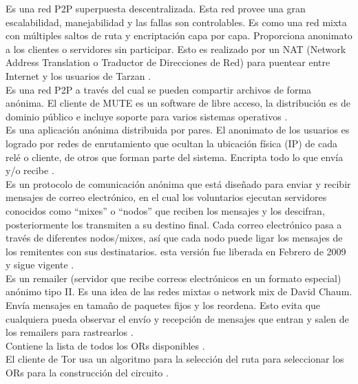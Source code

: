 \documentclass[10pt,letterpaper]{article}
\begin{document}
Es una red P2P superpuesta descentralizada. Esta red provee una gran escalabilidad, manejabilidad y las fallas son controlables. Es como una red mixta con múltiples saltos de ruta y encriptación capa por capa. Proporciona anonimato a los clientes o servidores sin participar. Esto es realizado por un NAT (Network Address Translation o Traductor de Direcciones de Red) para puentear entre Internet y los usuarios de Tarzan \cite{freedman2002tarzan}.\\

Es una red P2P a través del cual se pueden compartir archivos de forma anónima. El cliente de MUTE es un software de libre acceso, la distribución es de dominio público e incluye soporte para varios sistemas operativos \cite{Mute}.\\

Es una aplicación anónima distribuida por pares. El anonimato de los usuarios es logrado por redes de enrutamiento que ocultan la ubicación física (IP) de cada relé o cliente, de otros que forman parte del sistema. Encripta todo lo que envía y/o recibe \cite{AntsP2P}.\\

Es un protocolo de comunicación anónima que está diseñado para enviar y recibir mensajes de correo electrónico, en el cual los voluntarios ejecutan servidores conocidos como ``mixes'' o ``nodos'' que reciben los mensajes y los descifran, posteriormente los transmiten a su destino final. Cada correo electrónico pasa a través de diferentes nodos/mixes, así que cada nodo puede ligar los mensajes de los remitentes con sus destinatarios. esta versión fue liberada en Febrero de 2009 y sigue vigente \cite{Mixminion}.\\

Es un remailer (servidor que recibe correos electrónicos en un formato especial) anónimo tipo II. Es una idea de las redes mixtas o network mix de David Chaum. Envía mensajes en tamaño de paquetes fijos y los reordena. Esto evita que cualquiera pueda observar el envío y recepción de mensajes que entran y salen de los remailers para rastrearlos \cite{Mixmaster}.\\

Contiene la lista de todos los ORs disponibles \cite{mccoy2008shining}.\\

El cliente de Tor usa un algoritmo para la selección del ruta para seleccionar los ORs para la construcción del circuito \cite{panchenko2012improving}.\\
\end{document}

